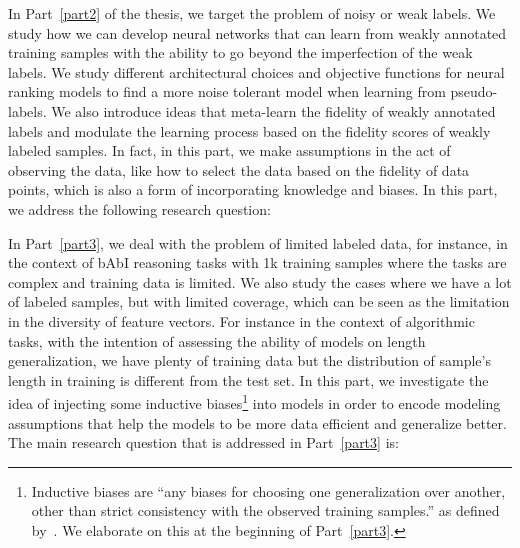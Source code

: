 \bigskip
In Part~\ref{part2} of the thesis, we target the problem of noisy or weak labels. We study how we can develop neural networks that can learn from weakly annotated training samples with the ability to go beyond the imperfection of the weak labels. We study different architectural choices and objective functions for neural ranking models to find a more noise tolerant model when learning from pseudo-labels.  We also introduce ideas that meta-learn the fidelity of weakly annotated labels and modulate the learning process based on the fidelity scores of weakly labeled samples. In fact, in this part, we make assumptions in the act of observing the data, like how to select the data based on the fidelity of data points, which is also a form of incorporating knowledge and biases.
In this part, we address the following research question:

\bigskip
In Part~\ref{part3}, we deal with the problem of limited labeled data, for instance, in the context of bAbI reasoning tasks with 1k training samples where the tasks are complex and training data is limited. We also study the cases where we have a lot of labeled samples, but with limited coverage, which can be seen as the limitation in the diversity of feature vectors. For instance in the context of algorithmic tasks, with the intention of assessing the ability of models on length generalization, we have plenty of training data but the distribution of sample's length in training is different from the test set. 
In this part, we investigate the idea of injecting some inductive biases\footnote{Inductive biases are ``any biases for choosing one generalization over another, other than strict consistency with the observed training samples.'' as defined by~\citet{Mitchell80theneed}. We elaborate on this at the beginning of Part~\ref{part3}.} into models in order to encode modeling assumptions that help the models to be more data efficient and generalize better.
The main research question that is addressed in Part~\ref{part3} is:


